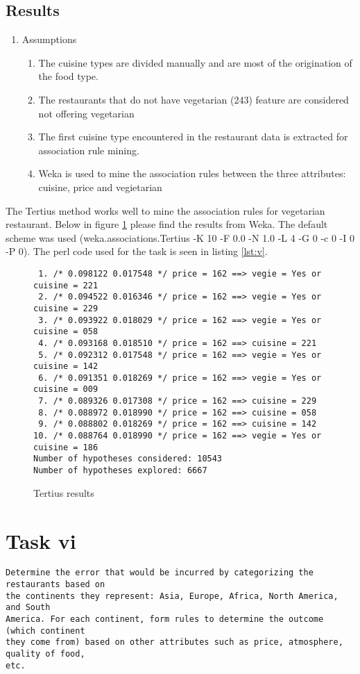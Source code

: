 \documentclass[letterpaper,10pt]{article}
\begin{document}
\subsection*{Results}
\begin{enumerate}
\item Assumptions 
\begin{enumerate}
\item The cuisine types are divided manually and are most of the origination of the food type.
\item The restaurants that do not have vegetarian (243) feature are considered not offering vegetarian
\item The first cuisine type encountered in the restaurant data is extracted for association rule mining.
\item Weka is used to mine the association rules between the three attributes: cuisine, price and vegietarian
\end{enumerate} 
\end{enumerate}
The Tertius method works well to mine the association rules for vegetarian restaurant. Below in figure \hyperref[fig:tv]{\ref{fig:tv}} please find the results from Weka. The default scheme was used (weka.associations.Tertius -K 10 -F 0.0 -N 1.0 -L 4 -G 0 -c 0 -I 0 -P 0). The perl code used for the task is seen in listing \hyperref[lst:v]{\ref{lst:v}}.
\begin{figure}[h]
\begin{verbatim}
 1. /* 0.098122 0.017548 */ price = 162 ==> vegie = Yes or cuisine = 221
 2. /* 0.094522 0.016346 */ price = 162 ==> vegie = Yes or cuisine = 229
 3. /* 0.093922 0.018029 */ price = 162 ==> vegie = Yes or cuisine = 058
 4. /* 0.093168 0.018510 */ price = 162 ==> cuisine = 221
 5. /* 0.092312 0.017548 */ price = 162 ==> vegie = Yes or cuisine = 142
 6. /* 0.091351 0.018269 */ price = 162 ==> vegie = Yes or cuisine = 009
 7. /* 0.089326 0.017308 */ price = 162 ==> cuisine = 229
 8. /* 0.088972 0.018990 */ price = 162 ==> cuisine = 058
 9. /* 0.088802 0.018269 */ price = 162 ==> cuisine = 142
10. /* 0.088764 0.018990 */ price = 162 ==> vegie = Yes or cuisine = 186 
Number of hypotheses considered: 10543
Number of hypotheses explored: 6667
\end{verbatim}
\caption{Tertius results}
 \label{fig:tv} 
\end{figure}

\section*{Task vi}
\begin{verbatim}
Determine the error that would be incurred by categorizing the restaurants based on
the continents they represent: Asia, Europe, Africa, North America, and South
America. For each continent, form rules to determine the outcome (which continent
they come from) based on other attributes such as price, atmosphere, quality of food,
etc.
\end{verbatim}
\end{document}
